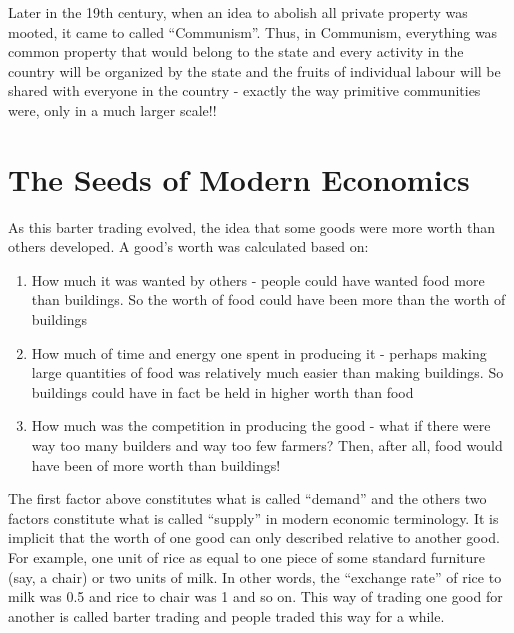 Later in the 19th century, when an idea to abolish all private property was mooted, it came to called ``Communism''. Thus, in Communism, everything was common property that would belong to the state and every activity in the country will be organized by the state and the fruits of individual labour will be shared with everyone in the country - exactly the way primitive communities were, only in a much larger scale!!

\section{The Seeds of Modern Economics}
As this barter trading evolved, the idea that some goods were more worth than others developed. A good's worth was calculated based on:

\begin{enumerate}
	\item How much it was wanted by others - people could have wanted food more than buildings. So the worth of food could have been more than the worth of buildings
	\item How much of time and energy one spent in producing it - perhaps making large quantities of food was relatively much easier than making buildings. So buildings could have in fact be held in higher worth than food
	\item  How much was the competition in producing the good - what if there were way too many builders and way too few farmers? Then, after all, food would have been of more worth than buildings!
\end{enumerate}

The first factor above constitutes what is called ``demand'' and the others two factors constitute what is called ``supply'' in modern economic terminology. It is implicit that the worth of one good can only described relative to another good. For example, one unit of rice as equal to one piece of some standard furniture (say, a chair) or two units of milk. In other words, the ``exchange rate'' of rice to milk was 0.5 and rice to chair was 1 and so on. This way of trading one good for another is called barter trading and people traded this way for a while.

